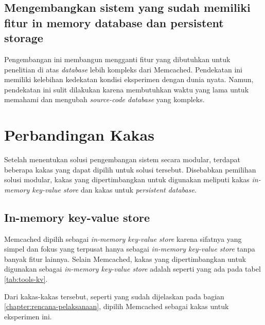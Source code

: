 \subsection{Mengembangkan sistem yang sudah memiliki fitur in memory database dan persistent storage}
Pengembangan ini membangun mengganti fitur yang dibutuhkan untuk penelitian di atas \textit{database} lebih kompleks dari Memcached. Pendekatan ini memiliki kelebihan kedekatan kondisi eksperimen dengan dunia nyata. Namun, pendekatan ini sulit dilakukan karena membutuhkan waktu yang lama untuk memahami dan mengubah \textit{source-code database} yang kompleks.

\section{Perbandingan Kakas}
Setelah menentukan solusi pengembangan sistem secara modular, terdapat beberapa kakas yang dapat dipilih untuk solusi tersebut. Disebabkan pemilihan solusi modular, kakas yang dipertimbangkan untuk digunakan meliputi kakas \textit{in-memory key-value store} dan kakas untuk \textit{persistent database}.

\subsection{In-memory key-value store}
Memcached dipilih sebagai \textit{in-memory key-value store} karena sifatnya yang simpel dan fokus yang terpusat hanya sebagai \textit{in-memory key-value store} tanpa banyak fitur lainnya. Selain Memcached, kakas yang dipertimbangkan untuk digunakan sebagai \textit{in-memory key-value store} adalah seperti yang ada pada tabel \ref{tab:tools-kv}.

\begin{table}[h]
    \centering
    \caption{Perbandingan kakas in-memory key-value store}
    \label{tab:tools-kv}
\end{table}

Dari kakas-kakas tersebut, seperti yang sudah dijelaskan pada bagian \ref{chapter:rencana-pelaksanaan}, dipilih Memcached sebagai kakas untuk eksperimen ini.


